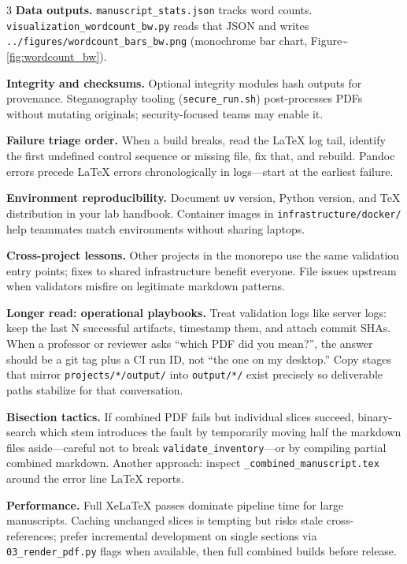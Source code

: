 \documentclass[
]{article}
\begin{document}
\begin{multicols}{3}
\textbf{Data outputs.} \texttt{manuscript\_stats.json} tracks word
counts. \texttt{visualization\_wordcount\_bw.py} reads that JSON and
writes \texttt{../figures/wordcount\_bars\_bw.png} (monochrome bar
chart, Figure\textasciitilde{}\ref{fig:wordcount_bw}).

\textbf{Integrity and checksums.} Optional integrity modules hash
outputs for provenance. Steganography tooling (\texttt{secure\_run.sh})
post-processes PDFs without mutating originals; security-focused teams
may enable it.

\textbf{Failure triage order.} When a build breaks, read the LaTeX log
tail, identify the first undefined control sequence or missing file, fix
that, and rebuild. Pandoc errors precede LaTeX errors chronologically in
logs---start at the earliest failure.

\textbf{Environment reproducibility.} Document \texttt{uv} version,
Python version, and TeX distribution in your lab handbook. Container
images in \texttt{infrastructure/docker/} help teammates match
environments without sharing laptops.

\textbf{Cross-project lessons.} Other projects in the monorepo use the
same validation entry points; fixes to shared infrastructure benefit
everyone. File issues upstream when validators misfire on legitimate
markdown patterns.

\textbf{Longer read: operational playbooks.} Treat validation logs like
server logs: keep the last N successful artifacts, timestamp them, and
attach commit SHAs. When a professor or reviewer asks ``which PDF did
you mean?'', the answer should be a git tag plus a CI run ID, not ``the
one on my desktop.'' Copy stages that mirror \texttt{projects/*/output/}
into \texttt{output/*/} exist precisely so deliverable paths stabilize
for that conversation.

\textbf{Bisection tactics.} If combined PDF fails but individual slices
succeed, binary-search which stem introduces the fault by temporarily
moving half the markdown files aside---careful not to break
\texttt{validate\_inventory}---or by compiling partial combined
markdown. Another approach: inspect \texttt{\_combined\_manuscript.tex}
around the error line LaTeX reports.

\textbf{Performance.} Full XeLaTeX passes dominate pipeline time for
large manuscripts. Caching unchanged slices is tempting but risks stale
cross-references; prefer incremental development on single sections via
\texttt{03\_render\_pdf.py} flags when available, then full combined
builds before release.


\end{multicols}
\end{document}
